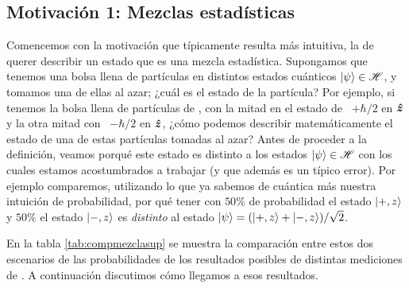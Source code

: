 \documentclass[10pt, a4paper]{article}
\numberwithin{equation}{subsection}
\begin{document}
\subsection{Motivación 1: Mezclas estadísticas}
Comencemos con la motivación que típicamente resulta más intuitiva, la de
querer describir un estado que es una mezcla estadística. Supongamos que
tenemos una bolsa llena de partículas en distintos estados cuánticos
$\ket{\psi} \in \mathscr{H}$, y tomamos una de ellas al azar; ¿cuál es el estado
de la partícula? Por ejemplo, si tenemos la bolsa llena de partículas de
\spinhalf, con la mitad en el estado de \spin~$+\hbar/2$ en $\vu*{z}$ y la
otra mitad con \spin~$-\hbar/2$ en $\vu*{z}$, ¿cómo podemos describir
matemáticamente el estado de una de estas partículas tomadas al azar? Antes de
proceder a la definición, veamos porqué este estado es distinto a los estados
$\ket{\psi} \in \mathscr{H}$ con los cuales estamos acostumbrados a trabajar (y
que además es un típico error). Por ejemplo comparemos, utilizando lo que ya
sabemos de cuántica más nuestra intuición de probabilidad, por qué tener con
$50\%$ de probabilidad el estado $\ket{+,z}$ y $50\%$ el estado $\ket{-,z}$ es
\emph{distinto} al estado $\ket{\psi} = (\ket{+,z} + \ket{-,z})/\sqrt{2}$.

En la tabla \ref{tab:compmezclasup} se muestra la comparación entre estos dos
escenarios de las probabilidades de los resultados posibles de distintas
mediciones de \spin. A continuación discutimos cómo llegamos a esos resultados.
\end{document}
